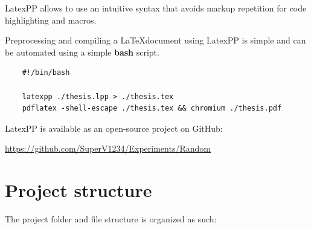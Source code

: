 \documentclass[12pt]{report}
\renewcommand\emph{\textbf}
\begin{document}
                    LatexPP allows to use an intuitive syntax that avoids markup repetition for code highlighting and macros.

                    Preprocessing and compiling a \LaTeX document using LatexPP is simple and can be automated using a simple \emph{bash} script.

\begin{verbatim}
    #!/bin/bash

    latexpp ./thesis.lpp > ./thesis.tex
    pdflatex -shell-escape ./thesis.tex && chromium ./thesis.pdf    
\end{verbatim}

                    LatexPP is available as an open-source project on GitHub:

                    \url{https://github.com/SuperV1234/Experiments/Random}


        \chapter{Project structure}
            The project folder and file structure is organized as such:
\end{document}
